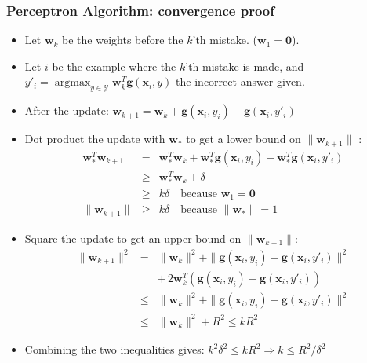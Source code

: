 \documentclass[ignorenonframetext,plain]{beamer}
\DeclareMathOperator*{\argmax}{argmax}
\renewcommand{\vec}{\mathbf}
\begin{document}
\begin{frame}\frametitle{Perceptron Algorithm: convergence proof}
\small
\begin{itemize}
\item Let $\vec{w}_k$ be the weights before the $k$'th mistake.
  ($\vec{w}_1 = \vec{0}$).
\item Let $i$ be the example where the $k$'th mistake is made, and
  $y'_i = \argmax_{y\in\mathcal{Y}} \vec{w}_k^T \vec{g}(\vec{x}_i,y)$
  the incorrect answer given.
\item After the update: $\vec{w}_{k+1} = \vec{w}_k + \vec{g}(\vec{x}_i,y_i) -
  \vec{g}(\vec{x}_i,y'_i)$
\item Dot product the update with $\vec{w}_*$ to get a lower bound on
  $\|\vec{w}_{k+1}\|$ :\begin{eqnarray*} 
\vec{w}_*^T \vec{w}_{k+1} &=& \vec{w}_*^T \vec{w}_k + \vec{w}_*^T
  \vec{g}(\vec{x}_i,y_i) - \vec{w}_*^T \vec{g}(\vec{x}_i,y'_i) \\
 &\geq& \vec{w}_*^T \vec{w}_k + \delta \\
 &\geq& k \delta 
  \quad\text{because } \vec{w}_1=\vec{0} \\
\|\vec{w}_{k+1}\| &\geq& k \delta 
  \quad\text{because } \|\vec{w}_*\|=1
\end{eqnarray*} 
\item Square the update to get an upper bound on
  $\|\vec{w}_{k+1}\|$: \begin{eqnarray*}
\|\vec{w}_{k+1}\|^2 &=& \|\vec{w}_k\|^2 + \|\vec{g}(\vec{x}_i,y_i) -
  \vec{g}(\vec{x}_i,y'_i)\|^2 \\
  && +\, 2 \vec{w}_k^T (\vec{g}(\vec{x}_i,y_i) -
  \vec{g}(\vec{x}_i,y'_i)) \\
&\leq& \|\vec{w}_k\|^2 + \|\vec{g}(\vec{x}_i,y_i) -
  \vec{g}(\vec{x}_i,y'_i)\|^2 \\
&\leq& \|\vec{w}_k\|^2 + R^2 \leq k R^2
\end{eqnarray*}
\item Combining the two inequalities gives: $ k^2 \delta^2 \leq k R^2
  \Rightarrow k \leq R^2 / \delta^2 $
\end{itemize}
\end{frame}
\end{document}
